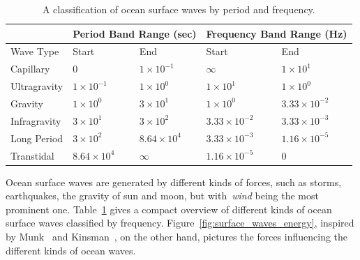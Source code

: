 \newcommand{\mvec}[1]{\mathbf{#1}}
\newcommand{\mvecx}[1]{\mathbf{#1}_x}
\newcommand{\mvecy}[1]{\mathbf{#1}_y}
\newcommand{\mvecz}[1]{\mathbf{#1}_z}
\newcommand{\mvecw}[1]{\mathbf{#1}_w}
\newcommand{\mmat}[1]{\mathbf{#1}}
\newcommand{\transpose}[1]{#1^{\mathsf{T}}}
\newcommand{\inverse}[1]{#1^{\mathsf{-1}}}
\newcommand{\normalise}[1]{\frac{#1}{\norm{#1}}}

\DeclarePairedDelimiter\abs{\lvert}{\rvert}
\DeclarePairedDelimiter\norm{\lVert}{\rVert}


\renewcommand{\Re}{\mathcal{R}}
\renewcommand{\Im}{\mathcal{I}} 

\begin{table}[b]
\begin{tabularx}{\textwidth}{X | X X | X X }
  \cline{2-5}
  & \multicolumn{2}{c}{Period Band Range (sec)} \vline & \multicolumn{2}{c}{Frequency Band Range (Hz)} \\
  \hline
  Wave Type & Start & End & Start & End \\
 \hline
  Capillary    & $0$                & $1\times10^{-1}$   & $\infty$            & $1\times10^1$ \\
  Ultragravity & $1\times10^{-1}$   & $1\times10^{0}$    & $1\times10^1$       & $1\times10^0$ \\
  Gravity      & $1\times10^{0}$    & $3\times10^{1}$    & $1\times10^0$       & $3.33\times10^{-2}$ \\
  Infragravity & $3\times10^{1}$    & $3\times10^{2}$    & $3.33\times10^{-2}$ & $3.33\times10^{-3}$ \\
  Long Period  & $3\times10^{2}$    & $8.64\times10^{4}$ & $3.33\times10^{-3}$ & $1.16\times10^{-5}$ \\
  Transtidal   & $8.64\times10^{4}$ & $\infty$           & $1.16\times10^{-5}$ & $0$
\end{tabularx}
\caption{A classification of ocean surface waves by period and frequency.}
\label{tab:ocean_wave_period}
\end{table}

Ocean surface waves are generated by different kinds of forces, such as storms, earthquakes,
the gravity of sun and moon, but with~\emph{wind} being the most prominent one.
Table~\ref{tab:ocean_wave_period} gives a compact overview of different kinds of ocean surface waves
classified by frequency. Figure~\ref{fig:surface_waves_energy}, inspired by Munk~\cite{article:munkorigin}
and Kinsman~\cite{book:kinsman2002wind}, on the other hand, pictures the forces influencing the different kinds of ocean waves.\\

